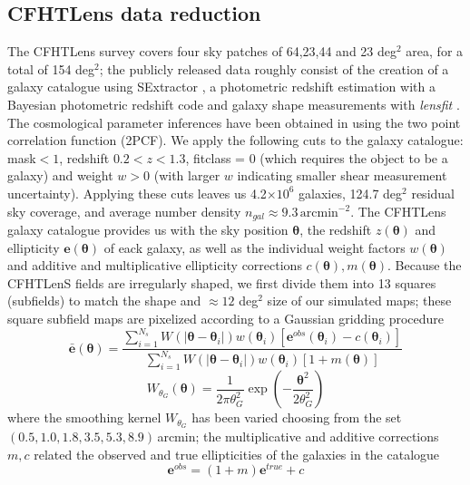 \documentclass[reprint,aps,prd,superscriptaddress,showkeys]{revtex4-1}
\begin{document}
\subsection{CFHTLens data reduction}
\label{cfhtdatareduction}
%
The CFHTLens survey covers four sky patches of 64,23,44 and 23 deg$^2$ area, for a total of 154 deg$^2$; the publicly released data roughly consist of the creation of a galaxy catalogue using SExtractor \citep{SExtractor}, a photometric redshift estimation with a Bayesian photometric redshift code \citep{PhotoCode} and galaxy shape measurements with \textit{lensfit} \citep{cfht1,cfht2}. The cosmological parameter inferences have been obtained in \citep{CFHTKilbinger} using the two point correlation function (2PCF). We apply the following cuts to the galaxy catalogue: mask$<1$, redshift $0.2 < z < 1.3$, fitclass = 0 (which requires the object to be a galaxy) and weight $w>0$ (with larger $w$ indicating smaller shear measurement uncertainty). Applying these cuts leaves us 4.2$\times10^6$ galaxies, 124.7 deg$^2$ residual sky coverage, and average number density $n_{gal} \approx 9.3\,\mathrm{arcmin}^{-2}$. The CFHTLens galaxy catalogue provides us with the sky position $\pmb{\theta}$, the redshift $z(\pmb{\theta})$ and ellipticity $\mathbf{e}(\pmb{\theta})$ of eack galaxy, as well as the individual weight factors $w(\pmb{\theta})$ and additive and multiplicative ellipticity corrections $c(\pmb{\theta}),m(\pmb{\theta})$. Because the CFHTLenS fields are irregularly shaped, we first divide them into 13 squares (subfields) to match the shape and $\approx12$ deg$^2$ size of our simulated maps; these square subfield maps are pixelized according to a Gaussian gridding procedure
\begin{equation}
\bar{\mathbf{e}}(\pmb{\theta}) = \frac{\sum_{i=1}^{N_s} W(\vert\pmb{\theta}-\pmb{\theta}_i\vert)w(\pmb{\theta}_i)[\mathbf{e}^{obs}(\pmb{\theta}_i)-c(\pmb{\theta}_i)]}{\sum_{i=1}^{N_s}W(\vert\pmb{\theta}-\pmb{\theta}_i\vert)w(\pmb{\theta}_i)[1+m(\pmb{\theta})]}
\end{equation} 
\begin{equation}
\label{gausskernel}
W_{\theta_G}(\pmb{\theta}) = \frac{1}{2\pi\theta_G^2}\exp{\left(-\frac{\pmb{\theta}^2}{2\theta_G^2}\right)}
\end{equation}
%
where the smoothing kernel $W_{\theta_G}$ has been varied choosing from the set $(0.5,1.0,1.8,3.5,5.3,8.9)\,$arcmin; the multiplicative and additive corrections $m,c$ related the observed and true ellipticities of the galaxies in the catalogue
\begin{equation}
\mathbf{e}^{obs} = (1+m)\mathbf{e}^{true} + c
\end{equation}
\end{document}
